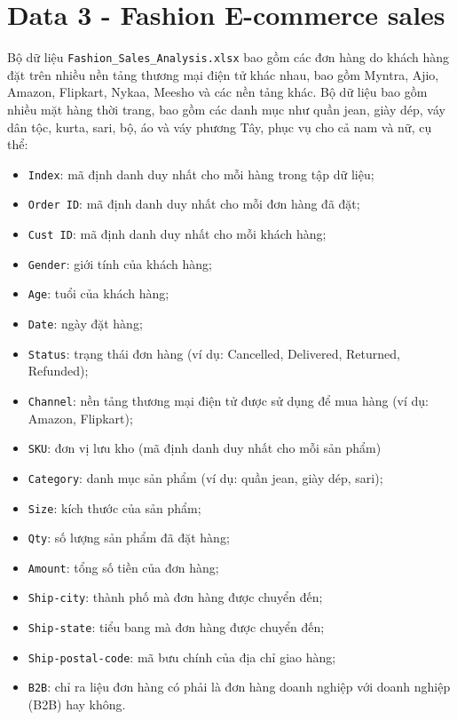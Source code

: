 \documentclass[12pt]{article}
\theoremstyle{definition} \newtheorem{exercise}[theorem]{\bf Bài tập}
\begin{document}
\section*{Data 3 - Fashion E-commerce sales}
Bộ dữ liệu \texttt{Fashion\_Sales\_Analysis.xlsx} bao gồm các đơn hàng do khách hàng đặt trên nhiều nền tảng thương mại điện tử khác nhau, bao gồm Myntra, Ajio, Amazon, Flipkart, Nykaa, Meesho và các nền tảng khác. Bộ dữ liệu bao gồm nhiều mặt hàng thời trang, bao gồm các danh mục như quần jean, giày dép, váy dân tộc, kurta, sari, bộ, áo và váy phương Tây, phục vụ cho cả nam và nữ, cụ thể:
\begin{itemize}
\item \texttt{Index}: mã định danh duy nhất cho mỗi hàng trong tập dữ liệu;
\item \texttt{Order ID}: mã định danh duy nhất cho mỗi đơn hàng đã đặt;
\item \texttt{Cust ID}: mã định danh duy nhất cho mỗi khách hàng;
\item \texttt{Gender}: giới tính của khách hàng;
\item \texttt{Age}: tuổi của khách hàng;
\item \texttt{Date}: ngày đặt hàng;
\item \texttt{Status}: trạng thái đơn hàng (ví dụ: Cancelled, Delivered, Returned, Refunded);
\item \texttt{Channel}: nền tảng thương mại điện tử được sử dụng để mua hàng (ví dụ: Amazon, Flipkart);
\item \texttt{SKU}: đơn vị lưu kho (mã định danh duy nhất cho mỗi sản phẩm)
\item \texttt{Category}: danh mục sản phẩm (ví dụ: quần jean, giày dép, sari);
\item \texttt{Size}: kích thước của sản phẩm;
\item \texttt{Qty}: số lượng sản phẩm đã đặt hàng;
\item \texttt{Amount}: tổng số tiền của đơn hàng;
\item \texttt{Ship-city}: thành phố mà đơn hàng được chuyển đến;
\item \texttt{Ship-state}: tiểu bang mà đơn hàng được chuyển đến;
\item \texttt{Ship-postal-code}: mã bưu chính của địa chỉ giao hàng;
\item \texttt{B2B}: chỉ ra liệu đơn hàng có phải là đơn hàng doanh nghiệp với doanh nghiệp (B2B) hay không.
\end{itemize}
\end{document}
